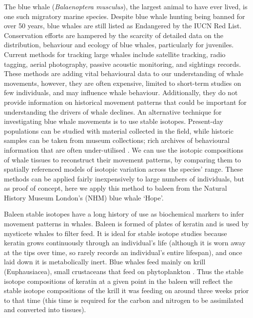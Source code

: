 \documentclass[a4paper,12pt]{article}
\begin{document}
The blue whale (\textit{Balaenoptera musculus}), the largest animal to have ever lived, is one such migratory marine species. 
Despite blue whale hunting being banned for over 50 years, blue whales are still listed as Endangered by the IUCN Red List\cite{reilly2008balaenoptera}.
Conservation efforts are hampered by the scarcity of detailed data on the distribution, behaviour and ecology of blue whales, particularly for juveniles. 
Current methods for tracking large whales include satellite tracking, radio tagging, aerial photography, passive acoustic monitoring, and sightings records\cite{borger15,mcdonald2006biogeographic,bailey2009behavioural,mate2007evolution,silva2013north}. 
These methods are adding vital behavioural data to our understanding of whale movements, however, they are often expensive, limited to short-term studies on few individuals\cite{bailey2009behavioural,best2015tag,mate2007evolution}, and may influence whale behaviour\cite{walker2012review}. 
Additionally, they do not provide information on historical movement patterns that could be important for understanding the drivers of whale declines.
An alternative technique for investigating blue whale movements is to use stable isotopes\cite{west2006stable,busquets2017estimating,hobson2008tracking}. 
Present-day populations can be studied with material collected in the field, while historic samples can be taken from museum collections; rich archives of behavioural information that are often under-utilised \cite{lister2011natural}.
We can use the isotopic compositions of whale tissues to reconstruct their movement patterns, by comparing them to spatially referenced models of isotopic variation across the species' range\cite{hobson1999tracing,hobson2008tracking,eisenmann2016isotopic}. 
These methods can be applied fairly inexpensively to large numbers of individuals, but as proof of concept, here we apply this method to baleen from the Natural History Museum London's (NHM) blue whale `Hope'.
 
Baleen stable isotopes have a long history of use as biochemical markers to infer movement patterns in whales\cite{ryan2013stable,best1996stable,hobson1998stable,hobson2008tracking}.
Baleen is formed of plates of keratin and is used by mysticete whales to filter feed. 
It is ideal for stable isotope studies because keratin grows continuously through an individual's life (although it is worn away at the tips over time, so rarely records an individual's entire lifespan), and once laid down it is metabolically inert\cite{best1996stable}. 
Blue whales feed mainly on krill (Euphausiacea), small crustaceans that feed on phytoplankton \cite{handbook}.
Thus the stable isotope compositions of keratin at a given point in the baleen will reflect the stable isotope compositions of the krill it was feeding on around three weeks prior to that time (this time is required for the carbon and nitrogen to be assimilated and converted into tissues). %
\end{document}
